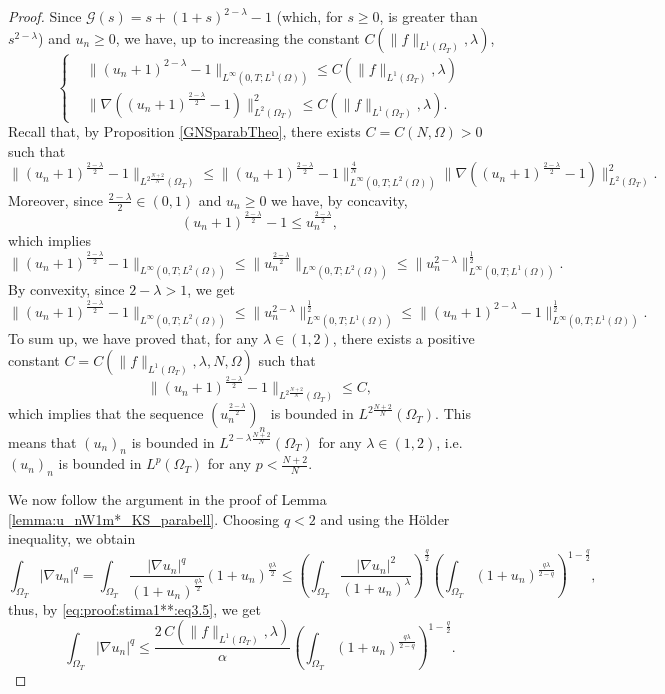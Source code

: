\documentclass[10pt,a4paper]{amsart}
\newcommand{\abs}[1]{\left|#1\right|}
\def\elle#1{L^{#1}}
\def\elleom#1{L^{#1}(\Omega)}
\def\elleomT#1{L^{#1}(\Omega_T)}
\def\ioT{\int_{\Omega_T}}
\def\norma#1#2{ \|#1 \|_{#2}}
\begin{document}
\begin{proof}
    Since $\mathcal{G}(s)=s+(1+s)^{2-\lambda}-1$ (which, for $s\geq0$, is greater than $s^{2-\lambda}$) and $u_n\geq0$, we have, up to increasing the constant $C\left(\|f\|_{L^1(\Omega_T)},\lambda\right)$,
    \begin{equation}\label{DoppiaStima-Lemma-StimaconfL1}
        \left\{\begin{aligned}
        & \norma{(u_n+1)^{2-\lambda}-1}{\elle\infty(0,T;\elleom1)}\leq C\left(\|f\|_{L^1(\Omega_T)}, \lambda\right)\\
        & \norma{\nabla \left((u_n+1)^\frac{2-\lambda}{2}-1\right)}{\elleomT2}^2\leq C\left(\|f\|_{L^1(\Omega_T)}, \lambda\right).
        \end{aligned}\right.
    \end{equation}
    Recall that, by Proposition \eqref{GNSparabTheo}, there exists $C=C(N,\Omega)>0$ such that
    $$\norma{(u_n+1)^\frac{2-\lambda}{2}-1}{\elleomT{2\frac{N+2}{N}}}
    \leq\norma{(u_n+1)^\frac{2-\lambda}{2}-1}{\elle\infty(0,T;\elleom2)}^\frac{4}{N}
    \norma{\nabla \left((u_n+1)^\frac{2-\lambda}{2}-1\right)}{\elleomT2}^2.
    $$
    Moreover, since $\frac{2-\lambda}{2}\in (0,1)$ and $u_n\geq0$ we have, by concavity,
    $$(u_n+1)^\frac{2-\lambda}{2}-1\leq u_n^\frac{2-\lambda}{2},$$
    which implies
    $$
    \norma{(u_n+1)^\frac{2-\lambda}{2}-1}{\elle\infty(0,T;\elleom2)}
    \leq 
    \norma{u_n^\frac{2-\lambda}{2}}{\elle\infty(0,T;\elleom2)}
    \leq
    \norma{u_n^{2-\lambda}}{\elle\infty(0,T;\elleom1)}^\frac{1}{2}.$$
    By convexity, since $2-\lambda>1$, we get
    $$\norma{(u_n+1)^\frac{2-\lambda}{2}-1}{\elle\infty(0,T;\elleom2)}
    \leq 
    \norma{u_n^{2-\lambda}}{\elle\infty(0,T;\elleom1)}^\frac{1}{2}
    \leq
    \norma{(u_n+1)^{2-\lambda}-1}{\elle\infty(0,T;\elleom1)}^\frac{1}{2}.$$
    To sum up, we have proved that, for any $\lambda\in(1,2)$, there exists a positive constant $C=C\left(\norma{f}{\elleomT1},\lambda,N,\Omega\right)$ such that
    \begin{equation}\label{eq:proof:stima1**:eq4}
        \norma{(u_n+1)^\frac{2-\lambda}{2}-1}{\elleomT{2\frac{N+2}{N}}}
    \leq C,
    \end{equation}
    which implies that the sequence $(u_n^\frac{2-\lambda}{2})_n$ is bounded in $\elleomT{2\frac{N+2}{N}}$. This means that $(u_n)_n$ is bounded in $\elleomT{{2-\lambda}\frac{N+2}{N}}$ for any $\lambda\in(1,2)$, i.e. $(u_n)_n$ is bounded in $\elleomT p$ for any $p<\frac{N+2}{N}$.

    We now follow the argument in the proof of Lemma \ref{lemma:u_nW1m*_KS_parabell}. Choosing $q<2$ and using the H\"older inequality, we obtain 
    $$\ioT \abs{\nabla u_n}^q =
    \ioT \frac{\abs{\nabla u_n}^q}{(1+u_n)^{\frac{q\lambda}{2}}}(1+u_n)^{\frac{q\lambda}{2}} 
    \leq
    \left(\ioT \frac{\abs{\nabla u_n}^2}{(1+u_n)^{\lambda}}\right)^\frac{q}{2}
    \left(\ioT (1+u_n)^{\frac{q\lambda}{2-q}}\right)^{1-\frac{q}{2}},$$
    thus, by \eqref{eq:proof:stima1**:eq3.5}, we get
    $$\ioT \abs{\nabla u_n}^q\leq 
     \frac{2\,C\left(\norma{f}{\elleomT1}, \lambda\right)}{\alpha}
    \left(\ioT (1+u_n)^{\frac{q\lambda}{2-q}}\right)^{1-\frac{q}{2}}.$$


\end{proof}
\end{document}
